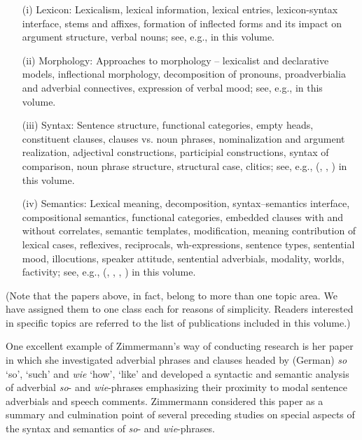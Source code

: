 \documentclass[output=paper,colorlinks,citecolor=brown]{langscibook}
\begin{document}
\begin{enumerate}

\item[(i)] Lexicon: Lexicalism, lexical information, lexical entries, lexicon-syntax interface, stems and affixes, formation of inflected forms and its impact on argument structure, verbal nouns; see, e.g., \textcite{Zimmermann1988intro} in this volume.

\item[(ii)] Morphology: Approaches to morphology -- lexicalist and declarative models, inflectional morphology, decomposition of pronouns, proadverbialia and adverbial connectives, expression of verbal mood; see, e.g., \textcite{Zimmermann2002} in this volume.

\item[(iii)] Syntax: Sentence structure, functional categories, empty heads, con\-stit\-u\-ent clauses, clauses vs. noun phrases, nominalization and argument realization, adjectival constructions, participial constructions, syntax of comparison, noun phrase structure, structural case, clitics; see, e.g., \citeauthor{Zimmermann1983} (\citeyear{Zimmermann1983}, \citeyear{Zimmermann1991intro}, \citeyear{Zimmermann1997}) in this volume.

\item[(iv)] Semantics: Lexical meaning, decomposition, syntax–semantics interface, compositional semantics, functional categories, embedded clauses with and without correlates, semantic templates, modification, meaning contribution of lexical cases, reflexives, reciprocals, wh-expressions, sentence types, sentential mood, illocutions, speaker attitude, sentential adverbials, modality, worlds, factivity; see, e.g., \citeauthor{Zimmermann2008} (\citeyear{Zimmermann2008}, \citeyear{Zimmermann2016intro}, \citeyear{Zimmermann2018intro}, \citeyear{Zimmermann2020}) in this volume.

\end{enumerate}

\noindent (Note that the papers above, in fact, belong to more than one topic area. We have assigned them to one class each for reasons of simplicity. Readers interested in specific topics are referred to the list of publications included in this volume.)

One excellent example of Zimmermann's way of conducting research is her \citeyear{Zimmermann1997} paper in which she investigated adverbial phrases and clauses headed by (German) \textit{so} ‘so’, ‘such’ and \textit{wie} ‘how’, ‘like’ and developed a syntactic and semantic analysis of adverbial \textit{so}- and \textit{wie}-phrases emphasizing their proximity to modal sentence adverbials and speech comments. Zimmermann considered this paper as a summary and culmination point of several preceding studies on special aspects of the syntax and semantics of \textit{so}- and \textit{wie}-phrases. 
\end{document}
